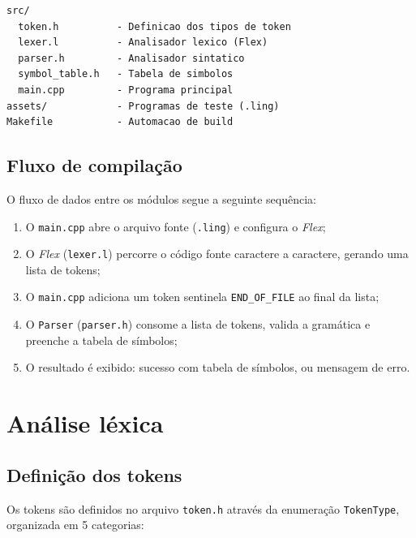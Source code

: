 \documentclass[a4paper, 12pt]{article}
\begin{document}
\begin{lstlisting}[numbers=none]
src/
  token.h          - Definicao dos tipos de token
  lexer.l          - Analisador lexico (Flex)
  parser.h         - Analisador sintatico
  symbol_table.h   - Tabela de simbolos
  main.cpp         - Programa principal
assets/            - Programas de teste (.ling)
Makefile           - Automacao de build
\end{lstlisting}

\subsection{Fluxo de compila\c{c}\~ao}

O fluxo de dados entre os m\'odulos segue a seguinte sequ\^encia:

\begin{enumerate}
    \item O \texttt{main.cpp} abre o arquivo fonte (\texttt{.ling}) e configura o \textit{Flex};
    \item O \textit{Flex} (\texttt{lexer.l}) percorre o c\'odigo fonte caractere a caractere, gerando uma lista de tokens;
    \item O \texttt{main.cpp} adiciona um token sentinela \texttt{END\_OF\_FILE} ao final da lista;
    \item O \texttt{Parser} (\texttt{parser.h}) consome a lista de tokens, valida a gram\'atica e preenche a tabela de s\'imbolos;
    \item O resultado \'e exibido: sucesso com tabela de s\'imbolos, ou mensagem de erro.
\end{enumerate}

\section{An\'alise l\'exica}

\subsection{Defini\c{c}\~ao dos tokens}

Os tokens s\~ao definidos no arquivo \texttt{token.h} atrav\'es da enumera\c{c}\~ao \texttt{TokenType}, organizada em 5 categorias:
\end{document}
